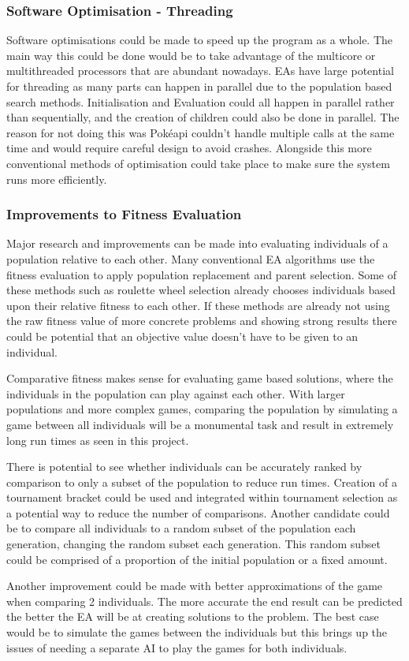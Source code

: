 \documentclass[a4paper]{article}
\newcommand{\Pokeapi}{Pok\'{e}api}
\begin{document}
\subsubsection{Software Optimisation - Threading}
\par
Software optimisations could be made to speed up the program as a whole.
The main way this could be done would be to take advantage of the multicore or multithreaded processors that are abundant nowadays.
EAs have large potential for threading as many parts can happen in parallel due to the population based search methods.
Initialisation and Evaluation could all happen in parallel rather than sequentially, and the creation of children could also be done in parallel.
The reason for not doing this was \Pokeapi{} couldn't handle multiple calls at the same time and would require careful design to avoid crashes.
Alongside this more conventional methods of optimisation could take place to make sure the system runs more efficiently.
\subsubsection{Improvements to Fitness Evaluation}
\par
Major research and improvements can be made into evaluating individuals of a population relative to each other.
Many conventional EA algorithms use the fitness evaluation to apply population replacement and parent selection.
Some of these methods such as roulette wheel selection already chooses individuals based upon their relative fitness to each other.
If these methods are already not using the raw fitness value of more concrete problems and showing strong results there could be potential that an objective value doesn't have to be given to an individual.
\par
Comparative fitness makes sense for evaluating game based solutions, where the individuals in the population can play against each other.
With larger populations and more complex games, comparing the population by simulating a game between all individuals will be a monumental task and result in extremely long run times as seen in this project.
\par
There is potential to see whether individuals can be accurately ranked by comparison to only a subset of the population to reduce run times.
Creation of a tournament bracket could be used and integrated within tournament selection as a potential way to reduce the number of comparisons.
Another candidate could be to compare all individuals to a random subset of the population each generation, changing the random subset each generation.
This random subset could be comprised of a proportion of the initial population or a fixed amount.
\par
Another improvement could be made with better approximations of the game when comparing 2 individuals.
The more accurate the end result can be predicted the better the EA will be at creating solutions to the problem.
The best case would be to simulate the games between the individuals but this brings up the issues of needing a separate AI to play the games for both individuals.
\end{document}
